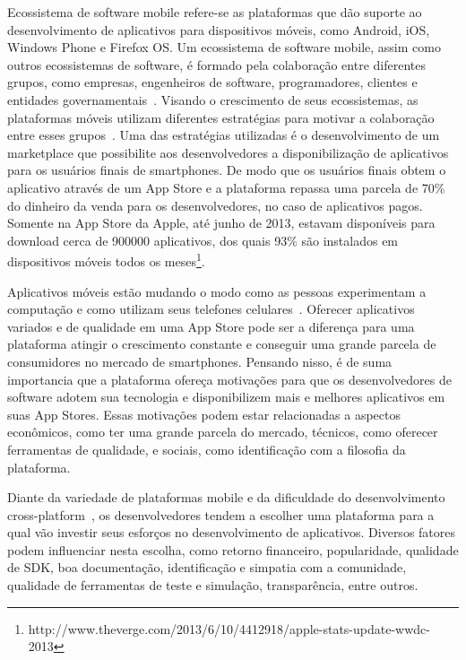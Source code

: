 \documentclass[conference]{IEEEtran}
\begin{document}
Ecossistema de software mobile refere-se as plataformas que dão suporte ao desenvolvimento de aplicativos para dispositivos móveis, como Android, iOS, Windows Phone e Firefox OS. Um ecossistema de software mobile, assim como outros ecossistemas de software, é formado pela colaboração entre diferentes grupos, como empresas, engenheiros de software, programadores, clientes e entidades governamentais~\cite{Jansen2013,Scacchi2012}. Visando o crescimento de seus ecossistemas, as plataformas móveis utilizam diferentes estratégias para motivar a colaboração entre esses grupos~\cite{Corral2014}. Uma das estratégias utilizadas é o desenvolvimento de um marketplace que possibilite aos desenvolvedores a disponibilização de aplicativos para os usuários finais de smartphones. De modo que os usuários finais obtem o aplicativo através de um App Store e a plataforma repassa uma parcela de 70\% do dinheiro da venda para os desenvolvedores, no caso de aplicativos pagos. Somente na App Store da Apple, até junho de 2013, estavam disponíveis para download cerca de 900000 aplicativos, dos quais 93\% são instalados em dispositivos móveis todos os meses\footnote{http://www.theverge.com/2013/6/10/4412918/apple-stats-update-wwdc-2013}. 
  
Aplicativos móveis estão mudando o modo como as pessoas experimentam a computação e como utilizam seus telefones celulares~\cite{Butler2011}. Oferecer aplicativos variados e de qualidade em uma App Store pode ser a diferença para uma plataforma atingir o crescimento constante e conseguir uma grande parcela de consumidores no mercado de smartphones. Pensando nisso, é de suma importancia que a plataforma ofereça motivações para que os desenvolvedores de software adotem sua tecnologia e disponibilizem mais e melhores aplicativos em suas App Stores. Essas motivações podem estar relacionadas a aspectos econômicos, como ter uma grande parcela do mercado, técnicos, como oferecer ferramentas de qualidade, e sociais, como identificação com a filosofia da plataforma.

Diante da variedade de plataformas mobile e da dificuldade do desenvolvimento cross-platform~\cite{Corral2012}, os desenvolvedores tendem a escolher uma plataforma para a qual vão investir seus esforços no desenvolvimento de aplicativos. Diversos fatores podem influenciar nesta escolha, como retorno financeiro, popularidade, qualidade de SDK, boa documentação, identificação e simpatia com a comunidade, qualidade de ferramentas de teste e simulação, transparência, entre outros. 
\end{document}
